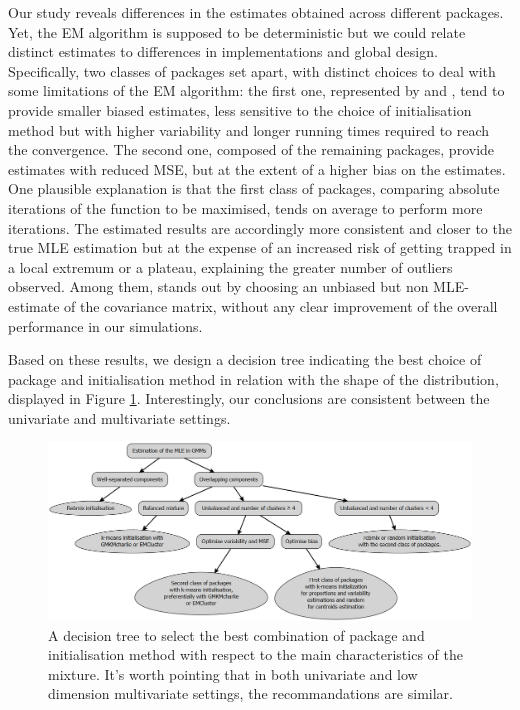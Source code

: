 Our study reveals differences in the estimates obtained across different packages.
Yet, the EM algorithm is supposed to be deterministic but we could relate distinct estimates to differences in implementations and global design.
Specifically, two classes of packages set apart, with distinct choices to deal with some limitations of the EM algorithm: the first
one, represented by  and , tend to provide
smaller biased estimates, less sensitive to the choice of initialisation
method but with higher variability and longer running times required to
reach the convergence. The second one, composed of the remaining
packages, provide estimates with reduced MSE, but at the extent of a
higher bias on the estimates. One plausible explanation is that the first class of packages, comparing absolute iterations of the function to be maximised, tends on average to perform more iterations. The estimated results are accordingly more consistent and closer to the true MLE estimation but at the expense of an increased risk of getting trapped in a local extremum or a plateau, explaining the greater number of outliers observed. Among them,  stands out by choosing
an unbiased but non MLE-estimate of the covariance matrix, without any clear improvement
of the overall performance in our simulations.

Based on these results, we design a decision tree indicating the best choice of package and initialisation method in relation with the shape of the distribution, displayed in Figure
\ref{fig:decision-tree-GMMs}. Interestingly, our conclusions are consistent between the univariate and multivariate settings.

\begin{figure}

{\centering \includegraphics[width=1\linewidth]{./figs/decision_tree_GMMs} 

}

\caption{A decision tree to select the best combination of package and initialisation method with respect to the main characteristics of the mixture. It's worth pointing that in both univariate and low dimension multivariate settings, the recommandations are similar.}\label{fig:decision-tree-GMMs}
\end{figure}

